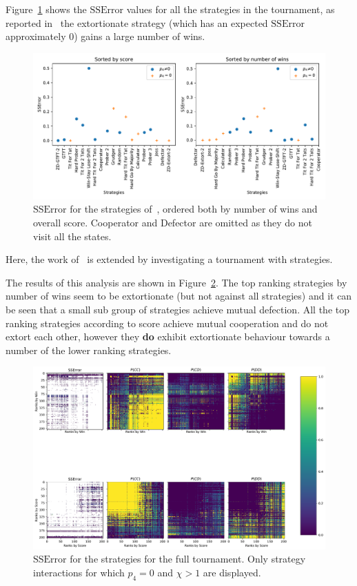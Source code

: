 \documentclass[a4paper]{article}
\begin{document}
Figure~\ref{fig:SSError_overall_in_stewart_plotkin} shows the \(\text{SSError}\)
values for all the strategies in the tournament, as reported
in~\cite{Stewart2012} the extortionate strategy (which has an expected
\(\text{SSError}\) approximately 0) gains a large number of wins.

\begin{figure}[!htbp]
    \centering
    \includegraphics[width=.8\textwidth]{./assets/img/SSError_overall_in_stewart_plotkin/main.pdf}
    \caption{\(\text{SSError}\) for the strategies of~\cite{Stewart2012},
    ordered both by number of wins and overall score. Cooperator and Defector
    are omitted as they do not visit all the states.}
    \label{fig:SSError_overall_in_stewart_plotkin}
\end{figure}

Here, the work of~\cite{Stewart2012} is extended by investigating a tournament
with 
strategies.

The results of this analysis are shown in
Figure~\ref{fig:SSError_and_probabilities_in_full}. The top ranking strategies
by number of wins seem to be extortionate (but not against all strategies) and
it can be seen that a small sub group of strategies achieve mutual defection.
All the top ranking strategies according to score achieve mutual cooperation and
do not extort each other, however they
\textbf{do} exhibit extortionate behaviour towards a number of the lower ranking
strategies.

\begin{figure}[!htbp]
    \centering
    \includegraphics[width=.8\textwidth]{./assets/img/SSError_and_probabilities_in_full/main.pdf}
    \caption{\(\text{SSError}\) for the strategies for the full tournament. Only
    strategy interactions for which \(p_4=0\) and \(\chi>1\) are displayed.}
    \label{fig:SSError_and_probabilities_in_full}
\end{figure}
\end{document}
